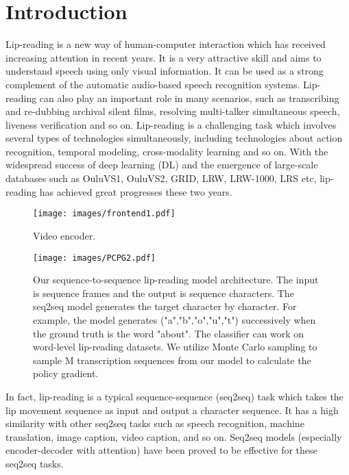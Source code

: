 \documentclass{bmvc2k}
\begin{document}
	\section{Introduction}
	\label{sec:intro}
	Lip-reading is a new way of human-computer interaction which has received increasing attention in recent years. It is a very attractive skill and aims to understand speech using only visual information\cite{B2017}. It can be used as a strong complement of the automatic audio-based speech recognition systems. Lip-reading can also play an important role in many scenarios, such as transcribing and re-dubbing archival silent films, resolving multi-talker simultaneous speech, liveness verification and so on\cite{Chung}. Lip-reading is a challenging task which involves several types of technologies simultaneously, including technologies about action recognition, temporal modeling, cross-modality learning and so on. With the widespread success of deep learning (DL) and the emergence of large-scale databases such as OuluVS1\cite{Zhao2009}, OuluVS2\cite{Zhao2015}, GRID\cite{cooke2006}, LRW\cite{B2017}, LRW-1000\cite{Yang2019}, LRS\cite{Chung} etc, lip-reading has achieved great progresses these two years. 
	\begin{figure}[H]
		\setlength{\abovecaptionskip}{-0.5cm}
		\setlength{\belowcaptionskip}{-0.2cm} 
		\centering
		\texttt{[image: images/frontend1.pdf]}
		\caption{Video encoder.}\label{figure1}
	\end{figure}
	\vspace{-0.5cm}
	\begin{figure}[H]
		\setlength{\abovecaptionskip}{0.05cm}
		\setlength{\belowcaptionskip}{-0.3cm} 
		\centering
		\texttt{[image: images/PCPG2.pdf]}
		\caption{Our sequence-to-sequence lip-reading model architecture. The input is sequence frames and the output is sequence characters. The seq2seq model generates the target character by character. For example, the model generates ("a","b","o","u","t") successively when the ground truth is the word "about". The classifier can work on word-level lip-reading datasets. We utilize Monte Carlo sampling to sample M transcription sequences from our model to calculate the policy gradient.}\label{figure2}
	\end{figure}
	
	
	In fact, lip-reading is a typical sequence-sequence (seq2seq) task which takes the lip movement sequence as input and output a character sequence. It has a high similarity with other seq2seq tasks such as speech recognition\cite{Rohit}, machine translation\cite{IIya}, image caption\cite{Chen2017}, video caption\cite{Venugopalan}, and so on. Seq2seq models (especially encoder-decoder with attention) have been proved to be effective for these seq2seq tasks. 
	
\end{document}
